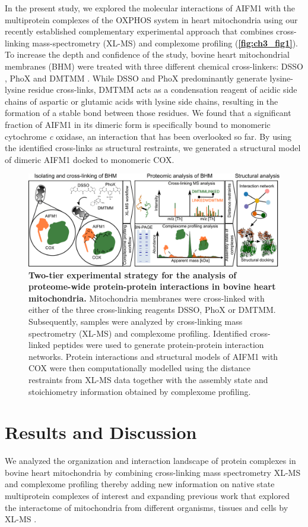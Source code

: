 In the present study, we explored the molecular interactions of AIFM1 with the multiprotein complexes of the OXPHOS system in heart mitochondria using our recently established complementary experimental approach \cite{RN11} that combines cross-linking mass-spectrometry (XL-MS) and complexome profiling (\textbf{\autoref{fig:ch3_fig1}}). To increase the depth and confidence of the study, bovine heart mitochondrial membranes (BHM) were treated with three different chemical cross-linkers: DSSO \cite{RN12}, PhoX \cite{RN13} and DMTMM \cite{RN14}. While DSSO and PhoX predominantly generate lysine-lysine residue cross-links, DMTMM acts as a condensation reagent of acidic side chains of aspartic or glutamic acids with lysine side chains, resulting in the formation of a stable bond between those residues. We found that a significant fraction of AIFM1 in its dimeric form is specifically bound to monomeric cytochrome \emph{c} oxidase, an interaction that has been overlooked so far. By using the identified cross-links as structural restraints, we generated a structural model of dimeric AIFM1 docked to monomeric COX.
\begin{figure}[htb]
	\center
	\includegraphics[]{Chapter.3/Figures/Figure1.png}
	\caption{\textbf{Two-tier experimental strategy for the analysis of proteome-wide protein-protein interactions in bovine heart mitochondria.} Mitochondria membranes were cross-linked with either of the three cross-linking reagents DSSO, PhoX or DMTMM. Subsequently, samples were analyzed by cross-linking mass spectrometry (XL-MS) and complexome profiling. Identified cross-linked peptides were used to generate protein-protein interaction networks. Protein interactions and structural models of AIFM1 with COX were then computationally modelled using the distance restraints from XL-MS data together with the assembly state and stoichiometry information obtained by complexome profiling.}
	\label{fig:ch3_fig1}
\end{figure}
%
\section{Results and Discussion}
We analyzed the organization and interaction landscape of protein complexes in bovine heart mitochondria by combining cross-linking mass spectrometry XL-MS and complexome profiling \cite{RN15, RN11} thereby adding new information on native state multiprotein complexes of interest and expanding previous work that explored the interactome of mitochondria from different organisms, tissues and cells by XL-MS \cite{RN20, RN18, RN16, RN19, RN17}.
%
